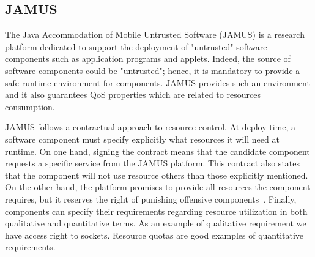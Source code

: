 \subsection{JAMUS} \label{JAMUS}

The Java Accommodation of Mobile Untrusted Software (JAMUS) is a research platform dedicated to support the deployment of "untrusted" software components such as application programs and applets.
Indeed, the source of software components could be "untrusted"; hence, it is mandatory to provide a safe runtime environment for components.
JAMUS provides such an environment and it also guarantees QoS properties which are related to resources consumption. 


JAMUS follows a contractual approach to resource control.
At deploy time, a software component must specify explicitly what resources it will need at runtime.
On one hand, signing the contract means that the candidate component requests a specific service from the JAMUS platform.
This contract also states that the component will not use resource others than those explicitly mentioned.
On the other hand, the platform promises to provide all resources the component requires, but it reserves the right of punishing offensive components~\cite{JAMUS2002}.
Finally, components can specify their requirements regarding resource utilization in both qualitative and quantitative terms.
As an example of qualitative requirement we have access right to sockets.
Resource quotas are good examples of quantitative requirements.

